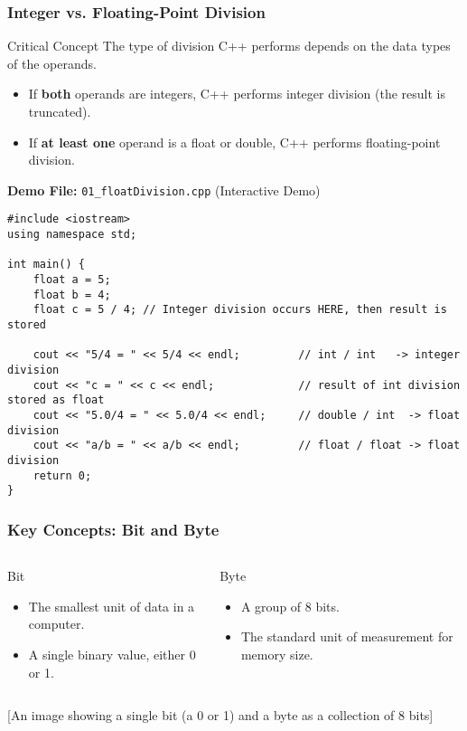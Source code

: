 \documentclass{beamer}
\begin{document}
\begin{frame}[fragile]
\frametitle{Integer vs. Floating-Point Division}
\begin{alertblock}{Critical Concept}
The type of division C++ performs depends on the data types of the operands.
\begin{itemize}
    \item If \textbf{both} operands are integers, C++ performs \alert{integer division} (the result is truncated).
    \item If \textbf{at least one} operand is a float or double, C++ performs \alert{floating-point division}.
\end{itemize}
\end{alertblock}

\pause

\textbf{Demo File:} \texttt{01\_floatDivision.cpp} (Interactive Demo)
\begin{verbatim}
#include <iostream>
using namespace std;

int main() {
    float a = 5;
    float b = 4;
    float c = 5 / 4; // Integer division occurs HERE, then result is stored

    cout << "5/4 = " << 5/4 << endl;         // int / int   -> integer division
    cout << "c = " << c << endl;             // result of int division stored as float
    cout << "5.0/4 = " << 5.0/4 << endl;     // double / int  -> float division
    cout << "a/b = " << a/b << endl;         // float / float -> float division
    return 0;
}
\end{verbatim}
\end{frame}

\begin{frame}
\frametitle{Key Concepts: Bit and Byte}
\begin{columns}[T]
    \begin{column}{0.5\textwidth}
        \begin{block}{Bit}
            \begin{itemize}
                \item The smallest unit of data in a computer.
                \item A single binary value, either \alert{0} or \alert{1}.
            \end{itemize}
        \end{block}
    \end{column}
    \begin{column}{0.5\textwidth}
        \begin{block}{Byte}
            \begin{itemize}
                \item A group of \alert{8 bits}.
                \item The standard unit of measurement for memory size.
            \end{itemize}
        \end{block}
    \end{column}
\end{columns}
\vfill
\alert{[An image showing a single bit (a 0 or 1) and a byte as a collection of 8 bits]}
\end{frame}
\end{document}
